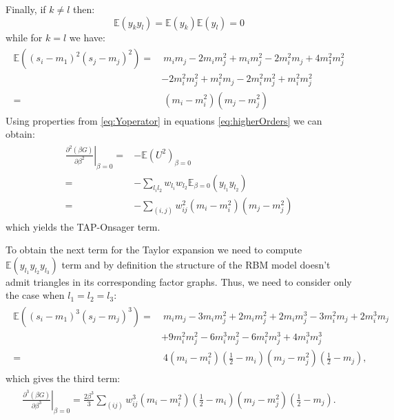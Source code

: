 \documentclass[12pt,a4paper]{article}
\begin{document}
Finally, if $k \neq l$ then:
$$\mathbb{E}(y_k y_l)= \mathbb{E}(y_k)\mathbb{E}(y_l)=0$$
while for $k = l$ we have:
\begin{align}
\begin{split}
\mathbb{E}((s_i-m_1)^2(s_j-m_j)^2)= & ~m_im_j - 2m_im_j^2 +m_im_j^2 - 2m_i^2m_j + 4m_1^2m_j^2\\
& - 2m_i^2m_j^2 + m_i^2m_j -2m_i^2m_j^2 + m_i^2m_j^2 \\
= & ~ (m_i -m_i^2)(m_j-m_j^2)
\label{eq:Yoperator}
 \end{split}
\end{align}
Using properties from \ref{eq:Yoperator} in equations \ref{eq:higherOrders} we can obtain:
\begin{align*}
\begin{split}
\left. \frac{\partial^2 (\beta G)}{\partial \beta^2}\right|_{\beta = 0} = & -\mathbb{E}(U^2)_{\beta =0}\\
= & - \sum_{l_i l_2} w_{l_i}w_{l_2} \mathbb{E}_{\beta = 0} (y_{l_1}y_{l_2} ) \\
= & - \sum_{(i,j)} w_{ij}^2 (m_i-m_i^2)(m_j-m_j^2)
\end{split}
\end{align*}
which yields the TAP-Onsager term.


To obtain the next term for the Taylor expansion we need to compute $\mathbb{E}(y_{l_1} y_{l_2} y_{l_3})$ term and by definition the structure of the RBM model doesn't admit triangles in its corresponding factor graphs. Thus, we need to consider only the case when $l_1 = l_2 = l_3$:
\begin{align}
\begin{split}
\mathbb{E}((s_i-m_1)^3(s_j-m_j)^3)= & ~m_i m_j -3m_i m_j^2 +2 m_i m_j^2 + 2m_im_j^3 -3 m_i^2 m_j 
 + 2 m_i^3 m_j \\
 & + 9 m_i^2m_j^2 - 6m_i^3 m_j^2 - 6 m_i^2 m_j^3 + 4m_i^3m_j^3 
 \\
  = &~ 4(m_i - m_i^2)(\frac{1}{2} - m_i)(m_j - m_j^2)(\frac{1}{2} - m_j),
 \end{split}
\end{align}
which gives the third term:
\begin{align*}
\begin{split}
\left. \frac{\partial^3 (\beta G)}{\partial \beta^3}\right|_{\beta = 0} = \frac{2\beta^3}{3} \sum_{(ij)} w_{ij}^3 (m_i - m_i^2)(\frac{1}{2} - m_i)(m_j - m_j^2)(\frac{1}{2} - m_j).
\end{split}
\end{align*}
\end{document}

